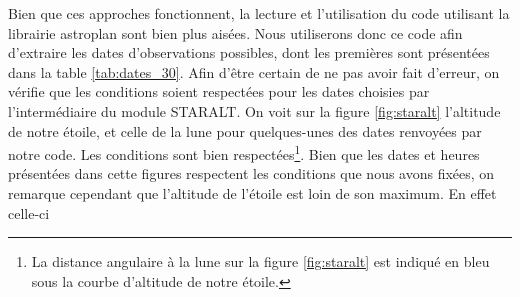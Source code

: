 \documentclass[10pt,french, openany]{book}
\begin{document}
    Bien que ces approches fonctionnent, la lecture et l'utilisation du code utilisant la librairie astroplan sont bien plus aisées. Nous utiliserons donc ce code afin d'extraire les dates d'observations possibles, dont les premières sont présentées dans la table \ref{tab:dates_30}. Afin d'être certain de ne pas avoir fait d'erreur, on vérifie que les conditions soient respectées pour les dates choisies par l'intermédiaire du module STARALT. On voit sur la figure \ref{fig:staralt} l'altitude de notre étoile, et celle de la lune pour quelques-unes des dates renvoyées par notre code. Les conditions sont bien respectées\footnote{La distance angulaire à la lune sur la figure \ref{fig:staralt} est indiqué en bleu sous la courbe d'altitude de notre étoile.}. Bien que les dates et heures présentées dans cette figures respectent les conditions que nous avons fixées, on remarque cependant que l'altitude de l'étoile est loin de son maximum. En effet celle-ci 
\end{document}
